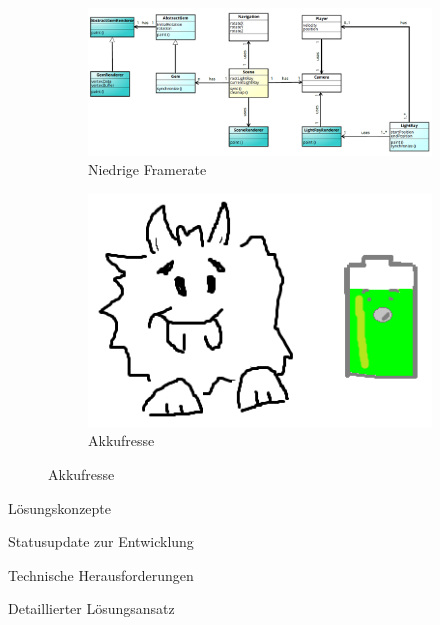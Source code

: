 {
	\begin{figure}
		\centering
		\begin{subfigure}{\textwidth}
			\centering
			\includegraphics[width=\textwidth, height=0.35\textheight, keepaspectratio]{images/klassendiagramm}
			\caption{Niedrige Framerate}
		\end{subfigure}
		\begin{subfigure}{\textwidth}
			\centering
			\includegraphics[width=\textwidth, height=0.35\textheight, keepaspectratio]{images/akkufresser}
			\caption{Akkufresse}
		\end{subfigure}
	\end{figure}
}


\begin{frame}{Lösungskonzepte}

\end{frame}

\begin{frame}{Statusupdate zur Entwicklung}

\end{frame}

\begin{frame}{Technische Herausforderungen}

\end{frame}

\begin{frame}{Detaillierter Lösungsansatz}

\end{frame}

%

